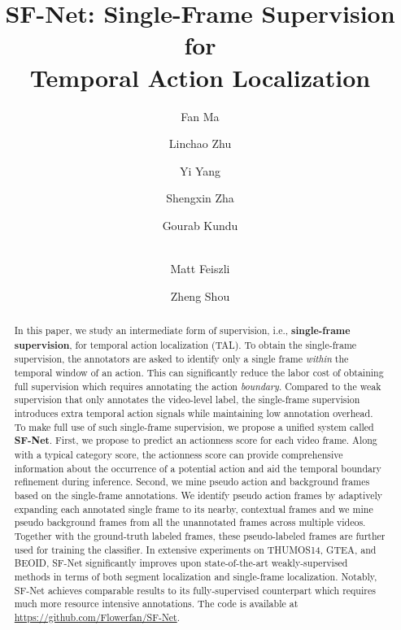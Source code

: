 \documentclass[runningheads]{llncs}
\begin{document}
\pagestyle{headings}
	\mainmatter
	\def\ECCVSubNumber{}  

	\title{SF-Net: Single-Frame Supervision for \\Temporal Action Localization} 



\author{Fan Ma \and
		Linchao Zhu \and
		Yi Yang \and
		Shengxin Zha \and
		Gourab Kundu \and \\
		Matt Feiszli \and
		Zheng Shou}
\maketitle
	
	\begin{abstract}
		{
			In this paper, we study an intermediate form of supervision, i.e., \textbf{single-frame supervision}, for temporal action localization (TAL).
			To obtain the single-frame supervision, the annotators are asked to identify only a single frame  \textit{within} the temporal window of an action. This can significantly reduce the labor cost of obtaining full supervision which requires annotating the action \textit{boundary}. Compared to the weak supervision that only annotates the video-level label, the single-frame supervision introduces extra temporal action signals while maintaining low annotation overhead.
			To make full use of such single-frame supervision, we propose a unified system called \textbf{SF-Net}.
			First, we propose to predict an actionness score for each video frame.
			Along with a typical category score, the actionness score can provide comprehensive information about the occurrence of a potential action and aid the temporal boundary refinement during inference.
			Second, we mine pseudo action and background frames based on the single-frame annotations.
			We identify pseudo action frames by adaptively expanding each annotated single frame to its nearby, contextual frames and we mine pseudo background frames from all the unannotated frames across multiple videos.
			Together with the ground-truth labeled frames, these pseudo-labeled frames are further used for training the classifier.
			In extensive experiments on THUMOS14, GTEA, and BEOID, SF-Net significantly improves upon state-of-the-art weakly-supervised methods in terms of both segment localization and single-frame localization.
			Notably, SF-Net achieves comparable results to its fully-supervised counterpart which requires much more resource intensive annotations. The code is available at \url{https://github.com/Flowerfan/SF-Net}.
		}
	\end{abstract}
	
\end{document}
